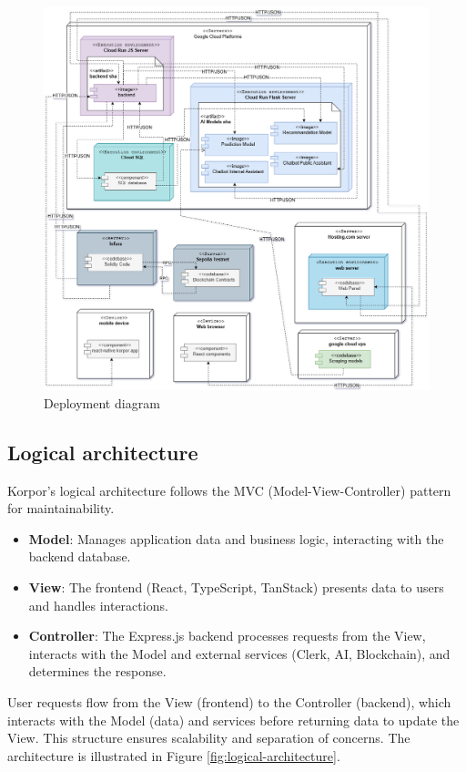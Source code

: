 \begin{figure}[htbp]
    \centering
    \includegraphics[width=1.03\textwidth]{images/deploiement_general_diag.png}
    \caption{Deployment diagram}
    \label{fig:physical-architecture}
\end{figure}

\subsection{Logical architecture}

Korpor's logical architecture follows the MVC (Model-View-Controller) pattern \cite{SunardiMVC2019, GammaPatterns1994} for maintainability.
\begin{itemize}
    \item \textbf{Model}: Manages application data and business logic, interacting with the backend database.
    \item \textbf{View}: The frontend (React, TypeScript, TanStack) presents data to users and handles interactions.
    \item \textbf{Controller}: The Express.js backend processes requests from the View, interacts with the Model and external services (Clerk, AI, Blockchain), and determines the response.
\end{itemize}
User requests flow from the View (frontend) to the Controller (backend), which interacts with the Model (data) and services before returning data to update the View. This structure ensures scalability and separation of concerns. The architecture is illustrated in Figure \ref{fig:logical-architecture}.

